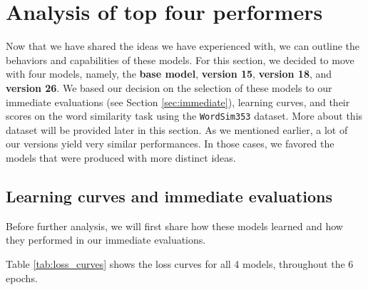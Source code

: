 \section{Analysis of top four performers}

Now that we have shared the ideas we have experienced with, we can outline the behaviors and capabilities of these models. For this section, we decided to move with four models, namely, the \textbf{base model}, \textbf{version 15}, \textbf{version 18}, and \textbf{version 26}. We based our decision on the selection of these models to our immediate evaluations (see Section \ref{sec:immediate}), learning curves, and their scores on the word similarity task using the \verb|WordSim353| dataset. More about this dataset will be provided later in this section. As we mentioned earlier, a lot of our versions yield very similar performances. In those cases, we favored the models that were produced with more distinct ideas.

\subsection{Learning curves and immediate evaluations}
Before further analysis, we will first share how these models learned and how they performed in our immediate evaluations.

Table \ref{tab:loss_curves} shows the loss curves for all 4 models, throughout the 6 epochs.


